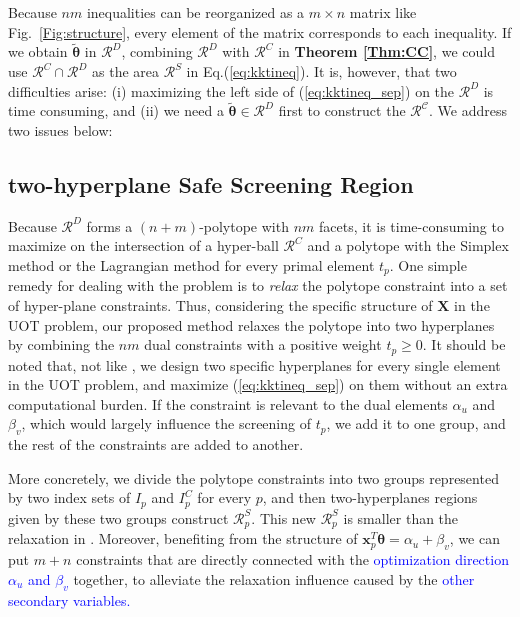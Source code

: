 \documentclass[twoside]{article}
\theoremstyle{plain}
\newcommand{\mat}[1]{\mathbf{#1}}
\renewcommand{\vec}[1]{\bm{#1}}
\newcommand{\changeXS}[1]{\textcolor{blue}{#1}}
\begin{document}
Because $nm$ inequalities can be reorganized as a $m \times n$ matrix like Fig.~\ref{Fig:structure}, every element of the matrix corresponds to each inequality. If we obtain $\tilde{\vec{\theta}}$ in $\mathcal{R}^{D}$, combining $\mathcal{R}^{D}$ with $\mathcal{R}^{C}$ in {\bf Theorem \ref{Thm:CC}}, we could use $\mathcal{R}^{C}\cap\mathcal{R}^{D}$ as the area $\mathcal{R}^{S}$ in Eq.(\ref{eq:kktineq}). It is, however, that two difficulties arise: (i) maximizing the left side of (\ref{eq:kktineq_sep}) on the $\mathcal{R}^{D}$ is time consuming, and (ii) we need a $\tilde{\vec{\theta}} \in \mathcal{R}^{D}$ first to construct the $\mathcal{R^{C}}$. We address two issues below:

\subsection{two-hyperplane Safe Screening Region}
Because $\mathcal{R}^D$ forms a $(n+m)$-polytope with $nm$ facets, it is time-consuming to maximize on the intersection of a hyper-ball $\mathcal{R}^{C}$ and a polytope with the Simplex method or the Lagrangian method for every primal element $t_p$. One simple remedy for dealing with the problem is to {\it relax} the polytope constraint into a set of hyper-plane constraints. Thus, considering the specific structure of $\mat X$ in the UOT problem, our proposed method relaxes the polytope into two hyperplanes by combining the $nm$ dual constraints with a positive weight $t_p \geq 0$. It should be noted that, not like \citep{7469344}, we design two specific hyperplanes for every single element in the UOT problem, and maximize (\ref{eq:kktineq_sep}) on them without an extra computational burden. If the constraint is relevant to the dual elements $\alpha_u$ and $\beta_v$, which would largely influence the screening of $t_p$, we add it to one group, and the rest of the constraints are added to another. 

More concretely, we divide the polytope constraints into two groups represented by two index sets of $I_p$ and ${I}^{C}_p$ for every $p$, and then two-hyperplanes regions given by these two groups construct $\mathcal{R}^S_{p}$. This new $\mathcal{R}^S_{p}$ is smaller than the relaxation in \citep{Yamada_NIPS_2021}. Moreover, benefiting from the structure of $\vec{x}_p^T\vec{\theta} = {\alpha}_{u} + {\beta}_{v}$, we can put $m+n$ constraints that are directly connected with the \changeXS{optimization direction $\alpha_u$ and $\beta_v$} together, to alleviate the relaxation influence caused by the \changeXS{other secondary variables.}
\end{document}
